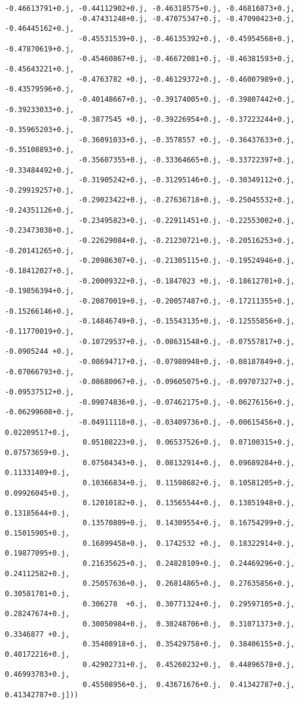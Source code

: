 \documentclass[11pt]{article}
\begin{document}
\begin{Verbatim}[commandchars=\\\{\}]
                 -0.46613791+0.j, -0.44112902+0.j, -0.46318575+0.j, -0.46816873+0.j,
                 -0.47431248+0.j, -0.47075347+0.j, -0.47090423+0.j, -0.46445162+0.j,
                 -0.45531539+0.j, -0.46135392+0.j, -0.45954568+0.j, -0.47870619+0.j,
                 -0.45460867+0.j, -0.46672081+0.j, -0.46381593+0.j, -0.45643221+0.j,
                 -0.4763782 +0.j, -0.46129372+0.j, -0.46007989+0.j, -0.43579596+0.j,
                 -0.40148667+0.j, -0.39174005+0.j, -0.39807442+0.j, -0.39233033+0.j,
                 -0.3877545 +0.j, -0.39226954+0.j, -0.37223244+0.j, -0.35965203+0.j,
                 -0.36091033+0.j, -0.3578557 +0.j, -0.36437633+0.j, -0.35108893+0.j,
                 -0.35607355+0.j, -0.33364665+0.j, -0.33722397+0.j, -0.33484492+0.j,
                 -0.31905242+0.j, -0.31295146+0.j, -0.30349112+0.j, -0.29919257+0.j,
                 -0.29023422+0.j, -0.27636718+0.j, -0.25045532+0.j, -0.24351126+0.j,
                 -0.23495823+0.j, -0.22911451+0.j, -0.22553002+0.j, -0.23473038+0.j,
                 -0.22629084+0.j, -0.21230721+0.j, -0.20516253+0.j, -0.20141265+0.j,
                 -0.20986307+0.j, -0.21305115+0.j, -0.19524946+0.j, -0.18412027+0.j,
                 -0.20009322+0.j, -0.1847023 +0.j, -0.18612701+0.j, -0.19856394+0.j,
                 -0.20870019+0.j, -0.20057487+0.j, -0.17211355+0.j, -0.15266146+0.j,
                 -0.14846749+0.j, -0.15543135+0.j, -0.12555856+0.j, -0.11770019+0.j,
                 -0.10729537+0.j, -0.08631548+0.j, -0.07557817+0.j, -0.0905244 +0.j,
                 -0.08694717+0.j, -0.07980948+0.j, -0.08187849+0.j, -0.07066793+0.j,
                 -0.08680067+0.j, -0.09605075+0.j, -0.09707327+0.j, -0.09537512+0.j,
                 -0.09074836+0.j, -0.07462175+0.j, -0.06276156+0.j, -0.06299608+0.j,
                 -0.04911118+0.j, -0.03409736+0.j, -0.00615456+0.j,  0.02209517+0.j,
                  0.05108223+0.j,  0.06537526+0.j,  0.07100315+0.j,  0.07573659+0.j,
                  0.07504343+0.j,  0.08132914+0.j,  0.09689284+0.j,  0.11331409+0.j,
                  0.10366834+0.j,  0.11598682+0.j,  0.10581205+0.j,  0.09926045+0.j,
                  0.12010182+0.j,  0.13565544+0.j,  0.13851948+0.j,  0.13185644+0.j,
                  0.13570809+0.j,  0.14309554+0.j,  0.16754299+0.j,  0.15015905+0.j,
                  0.16899458+0.j,  0.1742532 +0.j,  0.18322914+0.j,  0.19877095+0.j,
                  0.21635625+0.j,  0.24828109+0.j,  0.24469296+0.j,  0.24112582+0.j,
                  0.25057636+0.j,  0.26814865+0.j,  0.27635856+0.j,  0.30581701+0.j,
                  0.306278  +0.j,  0.30771324+0.j,  0.29597105+0.j,  0.28247674+0.j,
                  0.30050984+0.j,  0.30248706+0.j,  0.31071373+0.j,  0.3346877 +0.j,
                  0.35408918+0.j,  0.35429758+0.j,  0.38406155+0.j,  0.40172216+0.j,
                  0.42902731+0.j,  0.45260232+0.j,  0.44896578+0.j,  0.46993703+0.j,
                  0.45508956+0.j,  0.43671676+0.j,  0.41342787+0.j,  0.41342787+0.j]))
\end{Verbatim}
            
\end{document}
